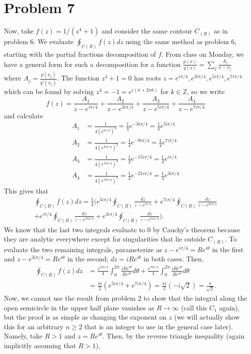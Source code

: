 \documentclass{article}
\begin{document}
\section{Problem 7}
Now, take $f(z)=1/(z^4+1)$ and consider the same contour $C_{(R)}$ as in problem 6. We evaluate $\oint_{C(R)} f(z)dz$ using the same method as problem 6, starting with the partial fractions decomposition of $f$. From class on Monday, we have a general form for such a decomposition for a function $\frac{p(x)}{q(x)}=\sum_j \frac{A_j}{x-x_j}$ where $A_j=\frac{p(x_j)}{q'(x_j)}$. The function $z^4+1=0$ has roots $z=e^{i\pi/4},e^{3i\pi/4},e^{5i\pi/4},e^{7i\pi/4}$ which can be found by solving $z^4=-1=e^{i(\pi+2\pi k)}$ for $k\in\mathbb{Z}$, so we write
\[
f(z)=\frac{A_1}{z-e^{i\pi/4}}+\frac{A_2}{z-e^{3i\pi/4}}+\frac{A_3}{z-e^{5i\pi/4}}+\frac{A_4}{z-e^{7i\pi/4}}
\]
and calculate
\begin{align*}
    A_1&=\frac{1}{4(e^{i\pi/4})^3}=\frac{1}{4}e^{-3i\pi/4}=\frac{1}{4}e^{5i\pi/4}\\
    A_2&=\frac{1}{4(e^{3i\pi/4})^3}=\frac{1}{4}e^{-9i\pi/4}=\frac{1}{4}e^{7i\pi/4}\\
    A_3&=\frac{1}{4(e^{5i\pi/4})^3}=\frac{1}{4}e^{-15i\pi/4}=\frac{1}{4}e^{i\pi/4}\\
    A_4&=\frac{1}{4(e^{7i\pi/4})^3}=\frac{1}{4}e^{-21i\pi/4}=\frac{1}{4}e^{3i\pi/4}
\end{align*}
This gives that 
\[
\begin{split}
\oint_{C(R)} f(z)dz=\frac{1}{4}\bigg(e^{5i\pi/4}\oint_{C(R)}\frac{dz}{z-e^{i\pi/4}}+e^{7i\pi/4}\oint_{C(R)}\frac{dz}{z-e^{3i\pi/4}}\\+e^{i\pi/4}\oint_{C(R)}\frac{dz}{z-e^{5i\pi/4}}+e^{3i\pi/4}\oint_{C(R)}\frac{dz}{z-e^{7i\pi/4}}\bigg).
\end{split}
\]
We know that the last two integrals evaluate to 0 by Cauchy's theorem because they are analytic everywhere except for singularities that lie outside $C_{(R)}$. To evaluate the two remaining integrals, parameterize as $z-e^{i\pi/4}=Re^{i\theta}$ in the first and $z-e^{3i\pi/4}=Re^{i\theta}$ in the second; $dz=iRe^{i\theta}$ in both cases. Then, 
\[
\begin{split}
\oint_{C(R)} f(z)dz&=\frac{e^{5i\pi/4}}{4}\int_0^{2\pi}\frac{iRe^{i\theta}}{Re^{i\theta}}d\theta+\frac{e^{7i\pi/4}}{4}\int_0^{2\pi}\frac{iRe^{i\theta}}{Re^{i\theta}}d\theta\\&=
\frac{\pi i}{2}(e^{5i\pi/4}+e^{7i\pi/4})=\frac{\pi i}{2}(-i\sqrt{2})=\frac{\pi}{\sqrt{2}}.
\end{split}
\]
Now, we cannot use the result from problem 2 to show that the integral along the open semicircle in the upper half plane vanishes as $R\to\infty$ (call this $C_1$ again), but the proof is as simple as changing the exponent on $z$ (we will actually show this for an arbitrary $n\geq2$ that is an integer to use in the general case later). Namely, take $R>1$ and $z=Re^{i\theta}$. Then, by the reverse triangle inequality (again implicitly assuming that $R>1$), 
\end{document}
